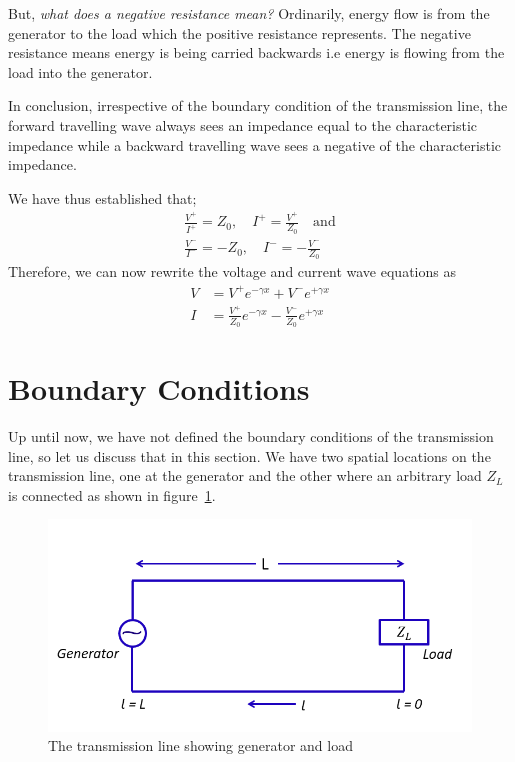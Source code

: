 But, \emph{what does a negative resistance mean?} Ordinarily, energy flow is from the generator to the load which the positive resistance represents. The negative resistance means energy is being carried backwards i.e energy is flowing from the load into the generator.

In conclusion, irrespective of the boundary condition of the transmission line, the forward travelling wave always sees an impedance equal to the characteristic impedance while a backward travelling wave sees a negative of the characteristic impedance.

We have thus established that;
\begin{align*}
\frac{V^+}{I^+} = Z_0,\quad I^+ = \frac{V^+}{Z_0}\quad\text{and}\\
\frac{V^-}{I^-} = -Z_0,\quad I^- = -\frac{V^-}{Z_0}
\end{align*}
Therefore, we can now rewrite the voltage and current wave equations as
\begin{align}
V &= V^+e^{-\gamma x}+V^-e^{+\gamma x}
\label{eqn:voltagelec3}\\
I &= \frac{V^+}{Z_0}e^{-\gamma x}-\frac{V^-}{Z_0}e^{+\gamma x}
\label{eqn:currentlec3}
\end{align}

\section{Boundary Conditions}
Up until now, we have not defined the boundary conditions of the transmission line, so let us discuss that in this section. We have two spatial locations on the transmission line, one at the generator and the other where an arbitrary load $Z_L$ is connected as shown in figure~\ref{fig:tlcircuit}.
\begin{figure}[h]
\centering
\includegraphics[scale=0.45]{graphics/TX_load_and_source}
\caption{The transmission line showing generator and load}
\label{fig:tlcircuit}
\end{figure}

